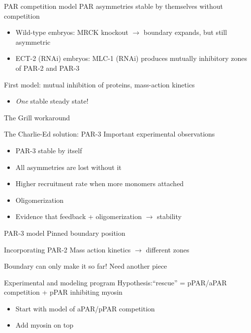 \documentclass{beamer}
\newcommand{\6}[1]{#1_{\text{6}}}
\newcommand{\3}[1]{#1_{\text{3}}}
\begin{document}
\begin{frame}{PAR competition model}
PAR asymmetries stable by themselves without competition
\begin{itemize}
\item Wild-type embryos: MRCK knockout $\rightarrow$ boundary expands, but still asymmetric
\item ECT-2 (RNAi) embryos: MLC-1 (RNAi) produces mutually inhibitory zones of PAR-2 and PAR-3
\end{itemize}

First model: mutual inhibition of proteins, mass-action kinetics
\begin{itemize}
\item \emph{One} stable steady state!
\end{itemize}
\end{frame}

\begin{frame}{The Grill workaround}

\end{frame}

\begin{frame}{The Charlie-Ed solution: PAR-3}
Important experimental observations
\begin{itemize}
\item PAR-3 stable by itself
\item All asymmetries are lost without it
\item Higher recruitment rate when more monomers attached
\item Oligomerization
\item Evidence that feedback + oligomerization $\rightarrow$ stability
\end{itemize}
\end{frame}

\begin{frame}{PAR-3 model}
Pinned boundary position
\end{frame}

\begin{frame}{Incorporating PAR-2}
Mass action kinetics $\rightarrow$ different zones

Boundary can only make it so far! Need another piece
\end{frame}

\begin{frame}{Experimental and modeling program}
Hypothesis:``rescue'' = pPAR/aPAR competition + pPAR inhibiting myosin 
\begin{itemize}
\item Start with model of aPAR/pPAR competition
\item Add myosin on top
\end{itemize}
\end{frame}
\end{document}
